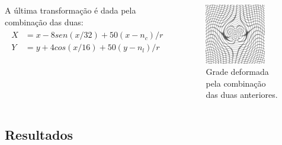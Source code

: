 \documentclass[t]{beamer}
\begin{document}
\begin{frame}
   \begin{columns}[c]
        A última transformação é dada pela combinação das duas:
        \begin{align}
        \begin{split}
            X &= x-8sen(x/32)+50(x-n_c)/r \\
            Y &= y+4cos(x/16)+50(y-n_l)/r
        \end{split} 
        \end{align}
        \begin{figure}[!h]
          \begin{center}
            \includegraphics[width=0.8\textwidth]{figuras/movingImageDistSin.png}
            \caption{Grade deformada pela combinação das duas anteriores.}
          \end{center}
        \end{figure}
    \end{columns}
\end{frame}

\subsection{Resultados}
\end{document}
